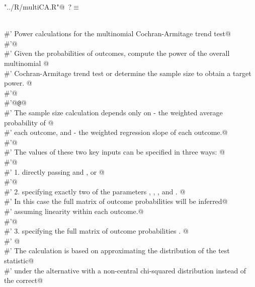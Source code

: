 \documentclass[reqno]{amsart}
\renewcommand{\NWtarget}[2]{\hypertarget{#1}{#2}}
\begin{document}
\begin{flushleft} \small\label{scrap16}\raggedright\small
\NWtarget{nuweb?}{} \verb@"../R/multiCA.R"@\nobreak\ {\footnotesize {?}}$\equiv$
\vspace{-1ex}
\begin{list}{}{} \item
\mbox{}\verb@@\\
\mbox{}\verb@#' Power calculations for the multinomial Cochran-Armitage trend test@\\
\mbox{}\verb@#'@\\
\mbox{}\verb@#' Given the probabilities of outcomes, compute the power of the overall multinomial @\\
\mbox{}\verb@#' Cochran-Armitage trend test or determine the sample size to obtain a target power. @\\
\mbox{}\verb@#'@\\
\mbox{}\verb@#'@{\tt @}\verb@details @\\
\mbox{}\verb@#' The sample size calculation depends only on  - the weighted average probability of @\\
\mbox{}\verb@#' each outcome, and  - the weighted regression slope of each outcome.@\\
\mbox{}\verb@#'@\\
\mbox{}\verb@#' The values of these two key inputs can be specified in three ways: @\\
\mbox{}\verb@#'@\\
\mbox{}\verb@#' 1. directly passing  and  , or @\\
\mbox{}\verb@#'@\\
\mbox{}\verb@#' 2. specifying exactly two of the parameters , , , and . @\\
\mbox{}\verb@#' In this case the full matrix of outcome probabilities will be inferred@\\
\mbox{}\verb@#' assuming linearity within each outcome.@\\
\mbox{}\verb@#'@\\
\mbox{}\verb@#' 3. specifying the full matrix of outcome probabilities .  @\\
\mbox{}\verb@#' @\\
\mbox{}\verb@#' The calculation is based on approximating the distribution of the test statistic@\\
\mbox{}\verb@#' under the alternative with a non-central chi-squared distribution instead of the correct@\\

\end{list}
\end{flushleft}
\end{document}
